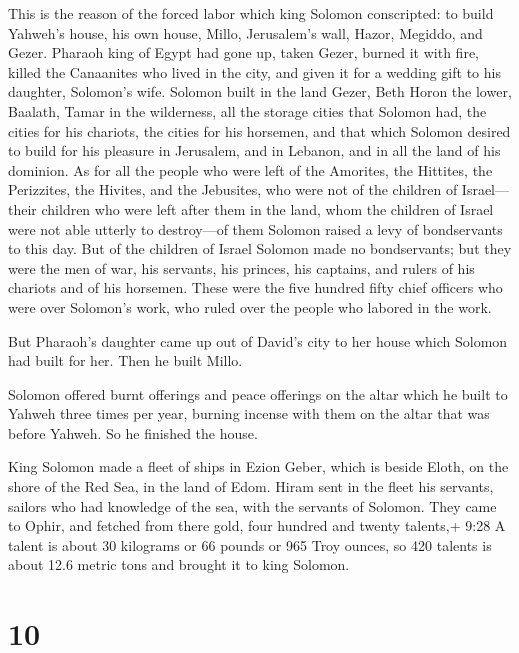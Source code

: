  This is the reason of the forced labor which king Solomon
conscripted: to build Yahweh's house, his own house, Millo, Jerusalem's
wall, Hazor, Megiddo, and Gezer.  Pharaoh king of Egypt had
gone up, taken Gezer, burned it with fire, killed the Canaanites who
lived in the city, and given it for a wedding gift to his daughter,
Solomon's wife.  Solomon built in the land Gezer, Beth
Horon the lower,  Baalath, Tamar in the wilderness,
 all the storage cities that Solomon had, the cities for
his chariots, the cities for his horsemen, and that which Solomon
desired to build for his pleasure in Jerusalem, and in Lebanon, and in
all the land of his dominion.  As for all the people who
were left of the Amorites, the Hittites, the Perizzites, the Hivites,
and the Jebusites, who were not of the children of Israel---
 their children who were left after them in the land, whom
the children of Israel were not able utterly to destroy---of them
Solomon raised a levy of bondservants to this day.  But of
the children of Israel Solomon made no bondservants; but they were the
men of war, his servants, his princes, his captains, and rulers of his
chariots and of his horsemen.  These were the five hundred
fifty chief officers who were over Solomon's work, who ruled over the
people who labored in the work.

 But Pharaoh's daughter came up out of David's city to her
house which Solomon had built for her. Then he built Millo.

 Solomon offered burnt offerings and peace offerings on the
altar which he built to Yahweh three times per year, burning incense
with them on the altar that was before Yahweh. So he finished the house.

 King Solomon made a fleet of ships in Ezion Geber, which
is beside Eloth, on the shore of the Red Sea, in the land of Edom.
 Hiram sent in the fleet his servants, sailors who had
knowledge of the sea, with the servants of Solomon.  They
came to Ophir, and fetched from there gold, four hundred and twenty
talents,+ 9:28 A talent is about 30 kilograms or 66 pounds or 965 Troy
ounces, so 420 talents is about 12.6 metric tons and brought it to king
Solomon.

\hypertarget{section-9}{%
\section{10}\label{section-9}}

